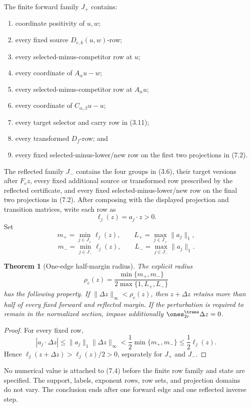 \documentclass[11pt]{article}
\newtheorem{theorem}{Theorem}[section]
\theoremstyle{definition}
\theoremstyle{remark}
\begin{document}
The finite forward family \(J_+\) contains:
\begin{enumerate}[label=(\arabic*)]
\item coordinate positivity of \(u,w\);
\item every fixed source \(D_{e,k}(u,w)\)-row;
\item every selected-minus-competitor row at \(u\);
\item every coordinate of \(A_\alpha u-w\);
\item every selected-minus-competitor row at \(A_\alpha u\);
\item every coordinate of \(C_{\alpha,\beta}u-u\);
\item every target selector and carry row in (3.11);
\item every transformed \(D_f\)-row; and
\item every fixed selected-minus-lower/new row on the first two projections
in (7.2).
\end{enumerate}
The reflected family \(J_-\) contains the four groups in (3.6), their
target versions after \(F_ez\), every fixed additional source or transformed
row prescribed by the reflected certificate, and every fixed
selected-minus-lower/new row on the final two projections in (7.2).
After composing with the displayed projection and transition matrices,
write each row as
\[
 \ell_j(z)=a_j\cdot z>0.
\]
Set
\[
 m_+=\min_{j\in J_+}\ell_j(z),\qquad
 L_+=\max_{j\in J_+}\|a_j\|_1,
\]
\[
 m_-=\min_{j\in J_-}\ell_j(z),\qquad
 L_-=\max_{j\in J_-}\|a_j\|_1.
\tag{7.3}
\]

\begin{theorem}[One-edge half-margin radius]
\label{thm:radius}
The explicit radius
\[
 \rho_e(z)=
 \frac{\min\{m_+,m_-\}}
      {2\max\{1,L_+,L_-\}}
\tag{7.4}
\]
has the following property.  If
\(\|\Delta z\|_\infty<\rho_e(z)\), then \(z+\Delta z\) retains more than
half of every fixed forward and reflected margin.  If the perturbation is
required to remain in the normalized section, impose additionally
\(\ones_{2r}^{\trans}\Delta z=0\).
\end{theorem}

\begin{proof}
For every fixed row,
\[
 |a_j\cdot\Delta z|
 \leq\|a_j\|_1\|\Delta z\|_\infty
 <\frac12\min\{m_+,m_-\}
 \leq\frac12\ell_j(z).
\]
Hence \(\ell_j(z+\Delta z)>\ell_j(z)/2>0\), separately for \(J_+\) and
\(J_-\).
\end{proof}

No numerical value is attached to (7.4) before the finite row family and
state are specified.  The support, labels, exponent rows, row sets, and
projection domains do not vary.  The conclusion ends after one forward
edge and one reflected inverse step.
\end{document}

